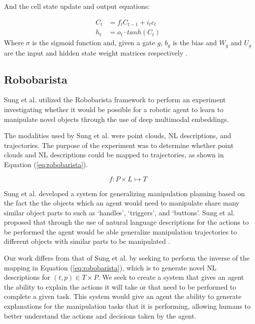 \documentclass[letterpaper, 12 pt, conference]{ieeeconf}
\begin{document}
And the cell state update and output equations:

\begin{align}
C_t &= f_tC_{t-1}+ i_t c_t \\
h_t&= o_t \cdot tanh(C_t)
\end{align}
Where $\sigma$ is the sigmoid function and, given a gate $g$, $b_g$ is the bias and $W_g$ and $U_g$ are the input and hidden state weight matrices respectively \cite{hochreiter1997long}.  

\subsection{Robobarista}

Sung et al. utilized the Robobarista framework to perform an experiment investigating whether it would be possible for a robotic agent to learn to manipulate novel objects through the use of deep multimodal embeddings.

The modalities used  by Sung et al. were point clouds, NL descriptions, and trajectories. The purpose of the experiment was to determine whether point clouds and NL descriptions could be mapped to trajectories, as shown in Equation (\ref{eq:robobarista}). 

\begin{equation}\label{eq:robobarista}
f: P\times L \mapsto T
\end{equation}

Sung et al. developed a system for generalizing manipulation planning based on the fact the the objects which an agent would need to manipulate share many similar object parts to such as ‘handles’, ‘triggers’, and ‘buttons’. Sung et al. proposed that through the use of natural language descriptions for the actions to be performed the agent would be able generalize manipulation trajectories to different objects with similar parts to be manipulated \cite{sung2016robobarista}. 

Our work differs from that of Sung et al. by seeking to perform the inverse of the mapping in Equation (\ref{eq:robobarista}), which is to generate novel NL descriptions for $(t,p)\in T\times P$. We seek to create a system that gives an agent the ability to explain the actions it will take or that need to be performed to complete a given task. This system would give an agent the ability to generate explanations for the manipulation tasks that it is performing, allowing humans to better understand the actions and decisions taken by the agent.
\end{document}
